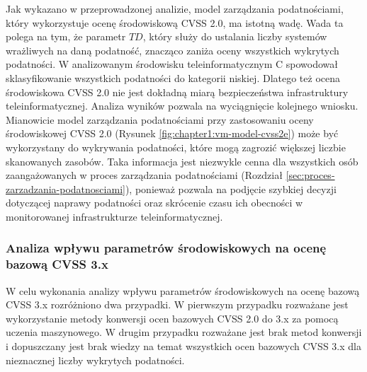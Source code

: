 \bigbreak
Jak wykazano w przeprowadzonej analizie, model zarządzania podatnościami, który wykorzystuje ocenę środowiskową CVSS 2.0, ma istotną wadę. Wada ta polega na tym, że parametr $TD$, który służy do ustalania liczby systemów wrażliwych na daną podatność, znacząco zaniża oceny wszystkich wykrytych podatności. W analizowanym środowisku teleinformatycznym C spowodował sklasyfikowanie wszystkich podatności do kategorii niskiej. Dlatego też ocena środowiskowa CVSS 2.0 nie jest dokładną miarą bezpieczeństwa infrastruktury teleinformatycznej. Analiza wyników pozwala na wyciągnięcie kolejnego wniosku. Mianowicie model zarządzania podatnościami przy zastosowaniu oceny środowiskowej CVSS 2.0 (Rysunek \ref{fig:chapter1:vm-model-cvss2e}) może być wykorzystany do wykrywania podatności, które mogą zagrozić większej liczbie skanowanych zasobów. Taka informacja jest niezwykle cenna dla wszystkich osób zaangażowanych w proces zarządzania podatnościami (Rozdział \ref{sec:proces-zarzadzania-podatnosciami}), ponieważ pozwala na podjęcie szybkiej decyzji dotyczącej naprawy podatności oraz skrócenie czasu ich obecności w monitorowanej infrastrukturze teleinformatycznej.


\subsubsection{Analiza wpływu parametrów środowiskowych na ocenę bazową CVSS 3.x}

W celu wykonania analizy wpływu parametrów środowiskowych na ocenę bazową CVSS 3.x rozróżniono dwa przypadki. W pierwszym przypadku rozważane jest wykorzystanie metody konwersji ocen bazowych CVSS 2.0 do 3.x za pomocą uczenia maszynowego. W drugim przypadku rozważane jest brak metod konwersji i dopuszczany jest brak wiedzy na temat wszystkich ocen bazowych CVSS 3.x dla nieznacznej liczby wykrytych podatności.

